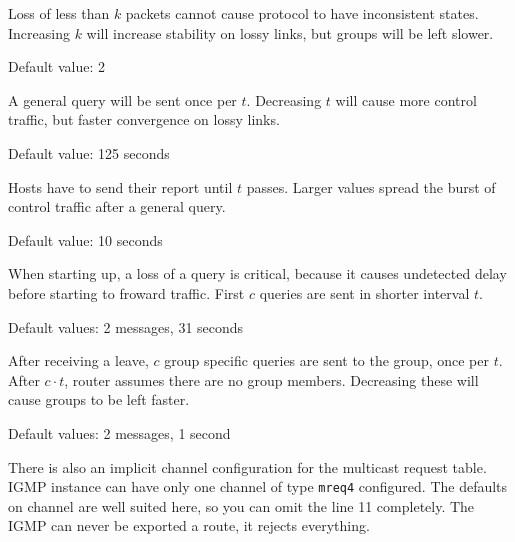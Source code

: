 \begin{description}[style=nextline]
\item[Robustness $k$]
  Loss of less than $k$ packets cannot cause protocol to have inconsistent
  states. Increasing $k$ will increase stability on lossy links, but groups
  will be left slower.

  Default value: 2

\item[Query interval $t$]
  A general query will be sent once per $t$. Decreasing $t$ will cause more
  control traffic, but faster convergence on lossy links.

  Default value: 125 seconds

\item[Query response interval $t$]
  Hosts have to send their report until $t$ passes. Larger values spread the
  burst of control traffic after a general query.

  Default value: 10 seconds

\item[Startup query count $c$, startup query interval $t$]
  When starting up, a loss of a query is critical, because it causes undetected
  delay before starting to froward traffic. First $c$ queries are sent in
  shorter interval $t$.

  Default values: 2 messages, 31 seconds

\item[Last member query count $c$, last member query interval $t$]
  After receiving a leave, $c$ group specific queries are sent to the group,
  once per $t$. After $c\cdot t$, router assumes there are no group members.
  Decreasing these will cause groups to be left faster.

  Default values: 2 messages, 1 second

\end{description}

There is also an implicit channel configuration for the multicast request
table. IGMP instance can have only one channel of type \texttt{mreq4}
configured. The defaults on channel are well suited here, so you can omit the
line 11 completely. The IGMP can never be exported a route, it rejects
everything.
